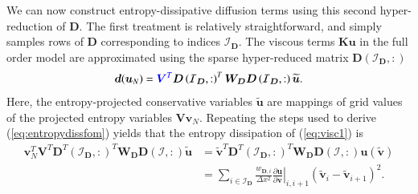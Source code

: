 \documentclass[preprint,10pt]{elsarticle}
\theoremstyle{definition}
\theoremstyle{lemma}
\theoremstyle{theorem}
\theoremstyle{assumption}
\renewcommand{\tilde}{\widetilde}
\newcommand{\pd}[2]{\frac{\partial#1}{\partial#2}}
\newcommand{\LRp}[1]{\left( #1 \right)}
\newcommand{\LRl}[1]{\left. #1 \right|}
\newcommand{\bnote}[1]{{\color{blue}{#1}}}
\begin{document}
We can now construct entropy-dissipative diffusion terms using this second hyper-reduction of $\bm{D}$.  The first treatment is relatively straightforward, and simply samples rows of $\bm{D}$ corresponding to indices $\mathcal{I}_{\bm{D}}$.  The viscous terms $\bm{K}\bm{u}$ in the full order model are approximated using the sparse hyper-reduced matrix $\bm{D}\LRp{\mathcal{I}_{\bm{D}},:}$
\begin{equation}
\bm{d}(\bm{u}_N) =\bnote{\bm{V}^T} \bm{D}\LRp{\mathcal{I}_{\bm{D}},:}^T \bm{W}_{\bm{D}} \bm{D}\LRp{\mathcal{I}_{\bm{D}},:}\tilde{\bm{u}}.
\label{eq:visc1}
\end{equation}
Here, the entropy-projected conservative variables $\tilde{\bm{u}}$ are mappings of grid values of the projected entropy variables  $\bm{V}\bm{v}_N$.  Repeating the steps used to derive (\ref{eq:entropydissfom}) yields that the entropy dissipation of (\ref{eq:visc1}) is 
\begin{align*}
\bm{v}_N^T\bm{V}^T\bm{D}^T\LRp{\mathcal{I}_{\bm{D}},:}^T \bm{W}_{\bm{D}} \bm{D}\LRp{\mathcal{I},:}\tilde{\bm{u}} &= 
\tilde{\bm{v}}^T\bm{D}^T\LRp{\mathcal{I}_{\bm{D}},:}^T \bm{W}_{\bm{D}} \bm{D}\LRp{\mathcal{I},:}\bm{u}\LRp{\tilde{\bm{v}}}
\\
&= \sum_{i\in \mathcal{I}_{\bm{D}}} \frac{w_{\bm{D},i}}{\Delta x^2} \LRl{\pd{\bm{u}}{\bm{v}}}_{i,i+1} \LRp{\tilde{\bm{v}}_i - \tilde{\bm{v}}_{i+1}}^2.
\end{align*}
\end{document}
